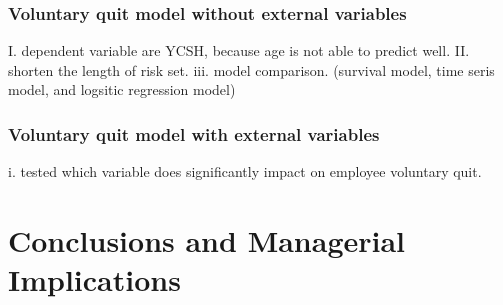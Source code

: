 \documentclass[12pt,letterpaper]{article}
\begin{document}
\subsubsection{Voluntary quit model without external variables}   
     I. dependent variable are YCSH, because age is not able to predict well.
     II. shorten the length of risk set.
     iii. model comparison. (survival model, time seris model, and logsitic regression model)
\subsubsection{Voluntary quit model with external variables}
    i. tested which variable does significantly impact on employee voluntary quit.
     

\section{Conclusions and Managerial Implications} 


	
\end{document}
